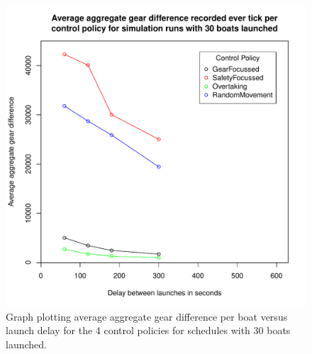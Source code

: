 \begin{figure}
\begin{center}
  \includegraphics[scale=0.8]{"images/graphs/Average aggregate gear difference recorded ever tick per control policy for simulation runs with 30 boats launched"}
  \caption{Graph plotting average aggregate gear difference per boat versus launch delay for the 4 control policies for schedules with 30 boats launched.}
  \label{appendix:graphs:gear_difference_30_launches}
\end{center}
\end{figure}